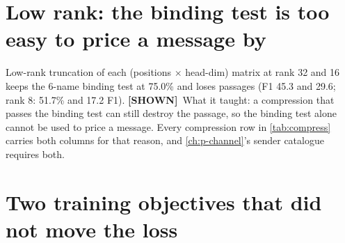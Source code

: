 \documentclass[11pt,a4paper]{report}
\newcommand{\SHOWN}{\textcolor{shownc}{\textbf{\scriptsize[SHOWN]}}}
\begin{document}
\section{Low rank: the binding test is too easy to price a message by}

Low-rank truncation of each (positions $\times$ head-dim) matrix at rank 32 and 16 keeps the 6-name binding test at 75.0\% and loses passages (F1 45.3 and 29.6; rank 8: 51.7\% and 17.2 F1). \SHOWN\ What it taught: a compression that passes the binding test can still destroy the passage, so the binding test alone cannot be used to price a message. Every compression row in \cref{tab:compress} carries both columns for that reason, and \cref{ch:p-channel}'s sender catalogue requires both.

\section{Two training objectives that did not move the loss}

\begin{table}[h]
\caption{Two projectors trained with an uncertainty objective (weight 1, 1,000 steps), scored exactly as in \cref{tab:confidence}.}
\label{tab:negative}
\vskip 0.1in
\begin{center}
\begin{small}
\end{small}
\end{center}
\end{table}
\end{document}
